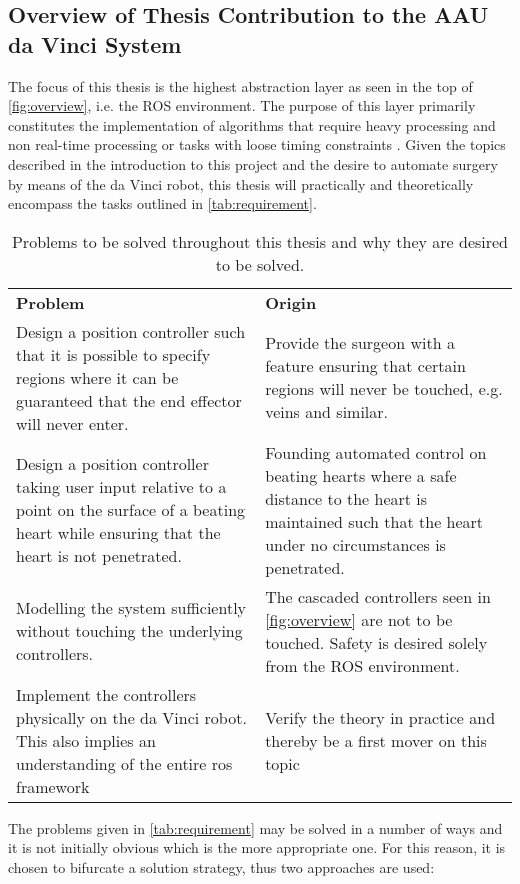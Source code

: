 \subsection{Overview of Thesis Contribution to the AAU da Vinci System}\label{sec:project_overview}
The focus of this thesis is the highest abstraction layer as seen in the top of \autoref{fig:overview}, i.e. the ROS environment. The purpose of this layer primarily constitutes the implementation of algorithms that require heavy processing and non real-time processing or tasks with loose timing constraints \citep{bib:robot_paper}.
Given the topics described in the introduction to this project and the desire to automate surgery by means of the da Vinci robot, this thesis will practically and theoretically encompass the tasks outlined in \autoref{tab:requirement}.
\begin{table}[H]
\begin{tabularx}{\textwidth}{X X}
\rowcolor{HeaderBlue} 
\textbf{Problem} &  \textbf{Origin}\\
Design a position controller such that it is possible to specify regions where it can be guaranteed that the end effector will never enter. & Provide the surgeon with a feature ensuring that certain regions will never be touched, e.g. veins and similar. \\
\rowcolor{textBlue} 
Design a position controller taking  user input relative to a point on the surface of a beating heart while ensuring that the heart is not penetrated. & Founding automated control on beating hearts where a safe distance to the heart is maintained such that the heart under no circumstances is penetrated.\\
Modelling the system sufficiently without touching the underlying controllers. & The cascaded controllers seen in \autoref{fig:overview} are not to be touched. Safety is desired solely from the ROS environment. \\
\rowcolor{textBlue} 
Implement the controllers physically on the da Vinci robot. This also implies an understanding of the entire \gls{ros} framework & Verify the theory in practice and thereby be a first mover on this topic \\
\end{tabularx}
	\caption{Problems to be solved throughout this thesis and why they are desired to be solved.}
\label{tab:requirement}
\end{table}
The problems given in \autoref{tab:requirement} may be solved in a number of ways and it is not initially obvious which is the more appropriate one. For this reason, it is chosen to bifurcate a solution strategy, thus two approaches are used:

